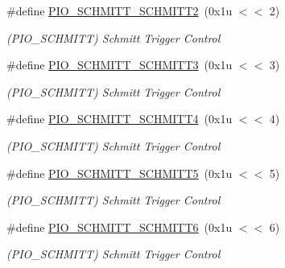 \begin{DoxyCompactItemize}
\#define \mbox{\hyperlink{group__SAME70__PIO_gad694f48d35253a97f0130c266a3ef205}{P\+I\+O\+\_\+\+S\+C\+H\+M\+I\+T\+T\+\_\+\+S\+C\+H\+M\+I\+T\+T2}}~(0x1u $<$$<$ 2)
\begin{DoxyCompactList}\small\item\em (P\+I\+O\+\_\+\+S\+C\+H\+M\+I\+TT) Schmitt Trigger Control \end{DoxyCompactList}\item 
\mbox{\label{group__SAME70__PIO_ga053f84ed45ae60fe148f33d85d353b60}} 
\#define \mbox{\hyperlink{group__SAME70__PIO_ga053f84ed45ae60fe148f33d85d353b60}{P\+I\+O\+\_\+\+S\+C\+H\+M\+I\+T\+T\+\_\+\+S\+C\+H\+M\+I\+T\+T3}}~(0x1u $<$$<$ 3)
\begin{DoxyCompactList}\small\item\em (P\+I\+O\+\_\+\+S\+C\+H\+M\+I\+TT) Schmitt Trigger Control \end{DoxyCompactList}\item 
\mbox{\label{group__SAME70__PIO_ga1cbd90a2be60ddd28c33fd41b310fb03}} 
\#define \mbox{\hyperlink{group__SAME70__PIO_ga1cbd90a2be60ddd28c33fd41b310fb03}{P\+I\+O\+\_\+\+S\+C\+H\+M\+I\+T\+T\+\_\+\+S\+C\+H\+M\+I\+T\+T4}}~(0x1u $<$$<$ 4)
\begin{DoxyCompactList}\small\item\em (P\+I\+O\+\_\+\+S\+C\+H\+M\+I\+TT) Schmitt Trigger Control \end{DoxyCompactList}\item 
\mbox{\label{group__SAME70__PIO_ga980ce945c4767dd4b1d1b10c521fff97}} 
\#define \mbox{\hyperlink{group__SAME70__PIO_ga980ce945c4767dd4b1d1b10c521fff97}{P\+I\+O\+\_\+\+S\+C\+H\+M\+I\+T\+T\+\_\+\+S\+C\+H\+M\+I\+T\+T5}}~(0x1u $<$$<$ 5)
\begin{DoxyCompactList}\small\item\em (P\+I\+O\+\_\+\+S\+C\+H\+M\+I\+TT) Schmitt Trigger Control \end{DoxyCompactList}\item 
\mbox{\label{group__SAME70__PIO_ga9cf918b651ea14e01b8ddf8408c44eb0}} 
\#define \mbox{\hyperlink{group__SAME70__PIO_ga9cf918b651ea14e01b8ddf8408c44eb0}{P\+I\+O\+\_\+\+S\+C\+H\+M\+I\+T\+T\+\_\+\+S\+C\+H\+M\+I\+T\+T6}}~(0x1u $<$$<$ 6)
\begin{DoxyCompactList}\small\item\em (P\+I\+O\+\_\+\+S\+C\+H\+M\+I\+TT) Schmitt Trigger Control \end{DoxyCompactList}\item 
$$
\end{DoxyCompactItemize}
